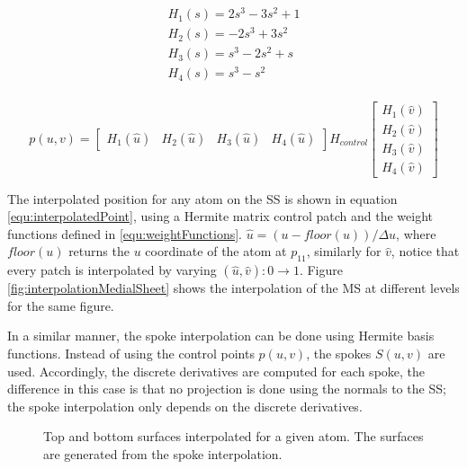 \begin{equation}
 \begin{array}{l}
  H_1(s)= 2s^3 - 3s^2 + 1\\
  H_2(s)= -2s^3 + 3s^2\\
  H_3(s)= s^3 - 2s^2 + s\\
  H_4(s)= s^3 - s^2\\
 \end{array}
\label{equ:weightFunctions}
\end{equation}

\begin{equation}
 p(u, v) = \left [ \begin{array}{cccc} H_1(\hat u) & H_2(\hat u) & H_3(\hat u) & H_4(\hat u) \end{array} \right ]
                H_{control}
           \left [ \begin{array}{c} H_1(\hat v) \\
				     H_2(\hat v) \\ 
				     H_3(\hat v) \\ 
				     H_4(\hat v) 
		    \end{array} \right ]
\label{equ:interpolatedPoint}
\end{equation}

The interpolated position for any atom on the SS is shown in equation \ref{equ:interpolatedPoint}, 
using a Hermite matrix control patch and the weight functions defined in \ref{equ:weightFunctions}.
$\hat u = (u - floor(u))/\Delta u$, where $floor(u)$ returns the $u$ coordinate of the atom at $p_{11}$,
similarly for $\hat v$, notice that every patch is interpolated by varying $(\hat u, \hat v): 0 \rightarrow 1$.
Figure \ref{fig:interpolationMedialSheet} shows the interpolation of the MS at different levels for the same figure.

In a similar manner, the spoke interpolation can be done using Hermite basis functions. Instead of using the control points
$p(u, v)$, the spokes $S(u, v)$ are used. Accordingly, the discrete derivatives are computed for each spoke, the difference
in this case is that no projection is done using the normals to the SS; the spoke interpolation only depends on the discrete derivatives. 


\begin{figure} 
 \centering  
 \caption[Top and bottom surface interpolation.]{Top and bottom surfaces interpolated for a given atom. The surfaces are generated from the spoke interpolation.}
 \label{fig:GeneratedSurfaceSpokeInterpolation}  
\end{figure}

